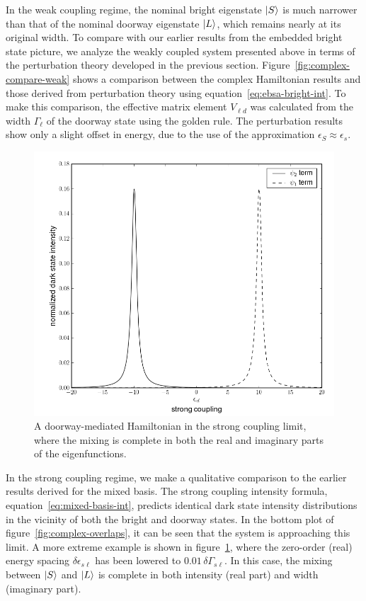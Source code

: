 \documentclass[12pt]{mitthesis}
\begin{document}
In the weak coupling regime, the nominal bright eigenstate $\mathinner{|{S}\rangle}$
is much narrower than that of the nominal doorway eigenstate
$\mathinner{|{L}\rangle}$, which remains nearly at its original width.  To compare
with our earlier results from the embedded bright state picture, we
analyze the weakly coupled system presented above in terms of the
perturbation theory developed in the previous section.
Figure~\ref{fig:complex-compare-weak} shows a comparison between the
complex Hamiltonian results and those derived from perturbation theory
using equation~\ref{eq:ebsa-bright-int}. To make this comparison, the
effective matrix element $V_{\ell d}$ was calculated from the width
$\Gamma_\ell$ of the doorway state using the golden rule. The
perturbation results show only a slight offset in energy, due to the
use of the approximation $\epsilon_{S} \approx \epsilon_{s}$.

\begin{figure}
  \caption{A doorway-mediated Hamiltonian in the strong coupling
    limit, where the mixing is complete in both the real and imaginary
    parts of the eigenfunctions.}
  \label{fig:complex-compare-strong}
  \centering
  \includegraphics[width=6in]{complex-compare-strong.png}
\end{figure}

In the strong coupling regime, we make a qualitative comparison to the
earlier results derived for the mixed basis.  The strong coupling
intensity formula, equation~\ref{eq:mixed-basis-int}, predicts
identical dark state intensity distributions in the vicinity of both
the bright and doorway states.  In the bottom plot of
figure~\ref{fig:complex-overlaps}, it can be seen that the system is
approaching this limit.  A more extreme example is shown in
figure~\ref{fig:complex-compare-strong}, where the zero-order (real)
energy spacing $\delta \epsilon_{s\ell}$ has been lowered to $0.01 \,
\delta \Gamma_{s\ell}$. In this case, the mixing between $\mathinner{|{S}\rangle}$ and
$\mathinner{|{L}\rangle}$ is complete in both intensity (real part) and width
(imaginary part).
\end{document}

